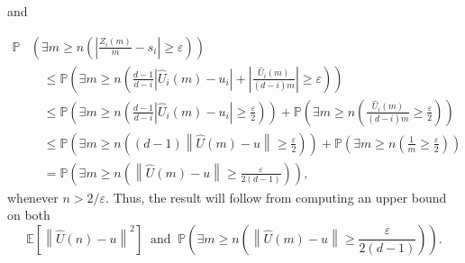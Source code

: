 \documentclass[12pt]{amsart}
\theoremstyle{definition}
\theoremstyle{remark}
\newcommand{\PP}{\mathbb{P}}
\newcommand{\EE}{\mathbb{E}}
\newcommand{\eps}{\varepsilon}
\begin{document}
and

\begin{align*}
    \PP&\left( \exists m\geq  n \left( \left|\frac{Z_i(m)}{m} - s_i \right|\geq \eps \right) \right)\\
    &\quad \leq \PP \left( \exists m\geq n \left( \frac{d-1}{d-i}\left| \hat{U}_i(m)-u_i\right| + \left|\frac{\hat{U}_i(m)}{(d-i)m}\right|\geq \eps \right) \right)\\
    &\quad \leq \PP \left( \exists m\geq n \left( \frac{d-1}{d-i}\left| \hat{U}_i(m)-u_i\right|\geq \frac{\eps}{2}\right)\right) + \PP\left( \exists m\geq n \left( \frac{\hat{U}_i(m)}{(d-i)m}\geq \frac{\eps}{2} \right) \right)\\
    &\quad \leq \PP \left( \exists m\geq n \left((d-1)\left\| \hat{U}(m)-u\right\|\geq \frac{\eps}{2}\right)\right) + \PP\left( \exists m\geq n \left( \frac{1}{m}\geq \frac{\eps}{2} \right) \right)\\
    &\quad = \PP \left( \exists m\geq n \left( \left\| \hat{U}(m)-u\right\|\geq \frac{\eps}{2(d-1)}\right) \right),
\end{align*}
whenever $n>2/\eps$. Thus, the result will follow from computing an upper bound on both
\[
\EE\left[ \left\| \hat{U}(n) - u \right\|^2 \right]\ \text{ and }\ \PP \left( \exists m\geq n \left( \left\| \hat{U}(m)-u\right\|\geq \frac{\eps}{2(d-1)}\right) \right).
\]
\end{document}
